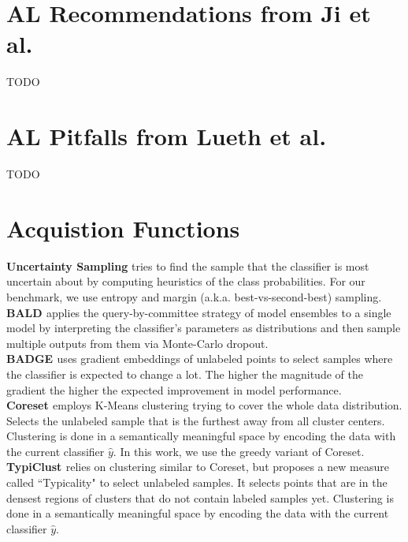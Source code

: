 \documentclass[]{article}
\begin{document}
\section{AL Recommendations from Ji et al.}\label{app:recommendations}
TODO



\section{AL Pitfalls from Lueth et al.}\label{app:pitfalls}
TODO


\section{Acquistion Functions}\label{app:acquisition_functions}
\textbf{Uncertainty Sampling} 
tries to find the sample that the classifier is most uncertain about by computing heuristics of the class probabilities. For our benchmark, we use entropy and margin (a.k.a. best-vs-second-best) sampling.\\
\textbf{BALD \cite{kirsch2019batchbald}}
applies the query-by-committee strategy of model ensembles to a single model by interpreting the classifier's parameters as distributions and then sample multiple outputs from them via Monte-Carlo dropout.\\
\textbf{BADGE \cite{ashdeep}} uses gradient embeddings of unlabeled points to select samples where the classifier is expected to change a lot. The higher the magnitude of the gradient the higher the expected improvement in model performance.\\
\textbf{Coreset \cite{sener2017active}}
employs K-Means clustering trying to cover the whole data distribution.
Selects the unlabeled sample that is the furthest away from all cluster centers.
Clustering is done in a semantically meaningful space by encoding the data with the current classifier $\hat y$.
In this work, we use the greedy variant of Coreset.\\
\textbf{TypiClust \cite{hacohen2022active}}
relies on clustering similar to Coreset, but proposes a new measure called ``Typicality" to select unlabeled samples.
It selects points that are in the densest regions of clusters that do not contain labeled samples yet.
Clustering is done in a semantically meaningful space by encoding the data with the current classifier $\hat y$.
\end{document}

